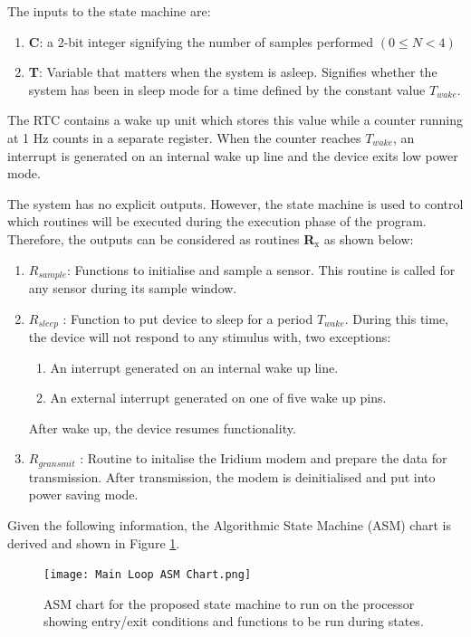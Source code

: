 The inputs to the state machine are:
\begin{enumerate}
	\item \textbf{C}: a 2-bit integer signifying the number of samples performed $(0 \leq N <4)$
	\item \textbf{T}: Variable that matters when the system is asleep. Signifies whether the system has been in sleep mode for a time defined by the constant value $T_{wake}$. 
\end{enumerate}
The RTC contains a wake up unit which stores this value while a counter running at 1 Hz counts in a separate register. When the counter reaches $T_{wake}$, an interrupt is generated on an internal wake up line and the device exits low power mode. \par
The system has no explicit outputs. However, the state machine is used to control which routines will be executed during the execution phase of the program. Therefore, the outputs can be considered as routines \textbf{R$_\text{x}$} as shown below:

\begin{enumerate}
	\item $R_{sample}$: Functions to initialise and sample a sensor. This routine is called for any sensor during its sample window.
	\item $R_{sleep}$ : Function to put device to sleep for a period $T_{wake}$. During this time, the device will not respond to any stimulus with, two exceptions:
		\begin{enumerate}
			\item An interrupt generated on an internal wake up line.
			\item An external interrupt generated on one of five wake up pins.
		\end{enumerate} After wake up, the device resumes functionality.
	\item $R_{gransmit}$ : Routine to initalise the Iridium modem and prepare the data for transmission. After transmission, the modem is deinitialised and put into power saving mode.
\end{enumerate}

Given the following information, the Algorithmic State Machine (ASM) chart is derived and shown in Figure \ref{fig:ASM_chart}.

\begin{figure}[H]
	\centering
	\texttt{[image: Main Loop ASM Chart.png]}
	\caption{ASM chart for the proposed state machine to run on the processor showing entry/exit conditions and functions to be run during states.}
	\label{fig:ASM_chart}
\end{figure}


